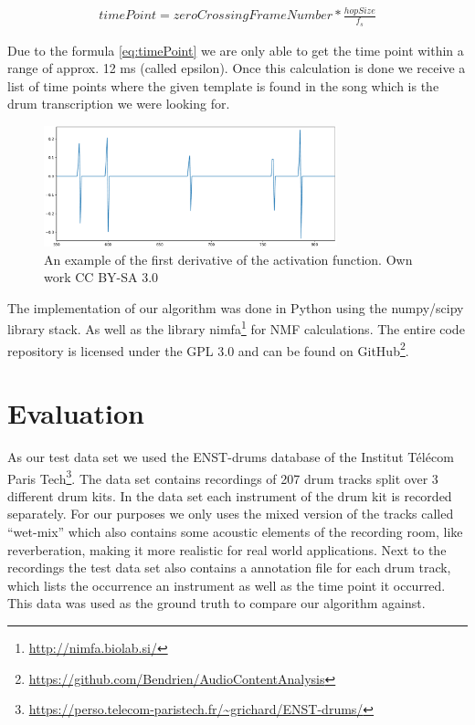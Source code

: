\documentclass{article}
\begin{document}
\begin{align}
\label{eq:timePoint}
timePoint = zeroCrossingFrameNumber * \frac{hopSize}{f_s}
\end{align}

Due to the formula \ref{eq:timePoint} we are only able to get the time point within a range of approx. 12 ms (called epsilon).
Once this calculation is done we receive a list of time points where the given template is found in the song which is the drum transcription we were looking for.

\begin{figure}[htb]

\begin{minipage}[b]{1.0\linewidth}
  \centering
  \centerline{\includegraphics[width=8.5cm]{figures/Ableitung}}
  \medskip
\end{minipage}

\caption{An example of the first derivative of the activation function. \scriptsize{\textsf{\textcopyright} Own work CC BY-SA 3.0}}
\label{fig:Ableitung}

\end{figure}


The implementation of our algorithm was done in Python using the numpy/scipy library stack. 
As well as the library nimfa\footnote{\url{http://nimfa.biolab.si/}} for NMF calculations.
The entire code repository is licensed under the GPL 3.0 and can be found on GitHub\footnote{\url{https://github.com/Bendrien/AudioContentAnalysis}}.




\section{Evaluation}
\label{sec:evaluation}

As our test data set we used the ENST-drums database of the Institut Télécom Paris Tech\footnote{\url{https://perso.telecom-paristech.fr/~grichard/ENST-drums/}}.
The data set contains recordings of 207 drum tracks split over 3 different drum kits.
In the data set each instrument of the drum kit is recorded separately.
For our purposes we only uses the mixed version of the tracks called ``wet-mix'' which also contains some acoustic elements of the recording room, like reverberation, making it more realistic for real world applications.
Next to the recordings the test data set also contains a annotation file for each drum track, which lists the occurrence an instrument as well as the time point it occurred.
This data was used as the ground truth to compare our algorithm against.
\end{document}
